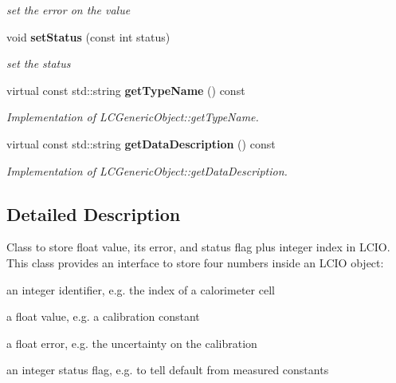 \begin{DoxyCompactItemize}
\begin{DoxyCompactList}\small\item\em set the error on the value \item\end{DoxyCompactList}\item 
void {\bf setStatus} (const int status)\label{classCALICE_1_1SimpleValue_a82caceee3e9f3757bd69be212788e4ad}

\begin{DoxyCompactList}\small\item\em set the status \item\end{DoxyCompactList}\item 
virtual const std::string {\bf getTypeName} () const \label{classCALICE_1_1SimpleValue_abbddaf6f2960066e61712572b74fa27c}

\begin{DoxyCompactList}\small\item\em Implementation of LCGenericObject::getTypeName. \item\end{DoxyCompactList}\item 
virtual const std::string {\bf getDataDescription} () const \label{classCALICE_1_1SimpleValue_a8ee24ee2c956cbec74a8209e84594694}

\begin{DoxyCompactList}\small\item\em Implementation of LCGenericObject::getDataDescription. \item\end{DoxyCompactList}\end{DoxyCompactItemize}


\subsection{Detailed Description}
Class to store float value, its error, and status flag plus integer index in LCIO. This class provides an interface to store four numbers inside an LCIO object:
\begin{DoxyItemize}
\item an integer identifier, e.g. the index of a calorimeter cell
\item a float value, e.g. a calibration constant
\item a float error, e.g. the uncertainty on the calibration
\item an integer status flag, e.g. to tell default from measured constants
\end{DoxyItemize}

